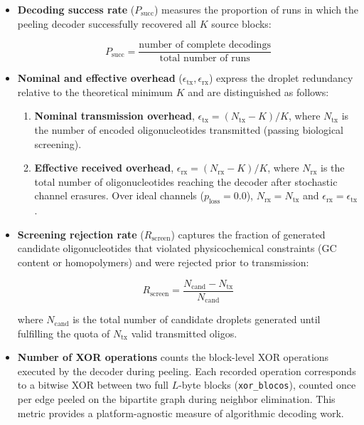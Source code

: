 \begin{itemize}
    \item \textbf{Decoding success rate} ($P_{\text{succ}}$) measures the proportion of runs in which the peeling decoder successfully recovered all $K$ source blocks:
    
    \begin{equation}
        \label{eq:taxa_sucesso}
        P_{\text{succ}} = \frac{\text{number of complete decodings}}{\text{total number of runs}}
    \end{equation}
    
    \item \textbf{Nominal and effective overhead} ($\epsilon_{\text{tx}}, \epsilon_{\text{rx}}$) express the droplet redundancy relative to the theoretical minimum $K$ and are distinguished as follows:
    \begin{enumerate}
        \item \textbf{Nominal transmission overhead}, $\epsilon_{\text{tx}} = (N_{\text{tx}} - K) / K$, where $N_{\text{tx}}$ is the number of encoded oligonucleotides transmitted (passing biological screening).
        \item \textbf{Effective received overhead}, $\epsilon_{\text{rx}} = (N_{\text{rx}} - K) / K$, where $N_{\text{rx}}$ is the total number of oligonucleotides reaching the decoder after stochastic channel erasures. Over ideal channels ($p_{\text{loss}} = 0.0$), $N_{\text{rx}} = N_{\text{tx}}$ and $\epsilon_{\text{rx}} = \epsilon_{\text{tx}}$.
    \end{enumerate}
    
    \item \textbf{Screening rejection rate} ($R_{\text{screen}}$) captures the fraction of generated candidate oligonucleotides that violated physicochemical constraints (GC content or homopolymers) and were rejected prior to transmission:
    
    \begin{equation}
        \label{eq:rejeicao}
        R_{\text{screen}} = \frac{N_{\text{cand}} - N_{\text{tx}}}{N_{\text{cand}}}
    \end{equation}
    
    where $N_{\text{cand}}$ is the total number of candidate droplets generated until fulfilling the quota of $N_{\text{tx}}$ valid transmitted oligos.
    
    \item \textbf{Number of XOR operations} counts the block-level XOR operations executed by the decoder during peeling. Each recorded operation corresponds to a bitwise XOR between two full $L$-byte blocks (\texttt{xor\_blocos}), counted once per edge peeled on the bipartite graph during neighbor elimination. This metric provides a platform-agnostic measure of algorithmic decoding work.
    

\end{itemize}
